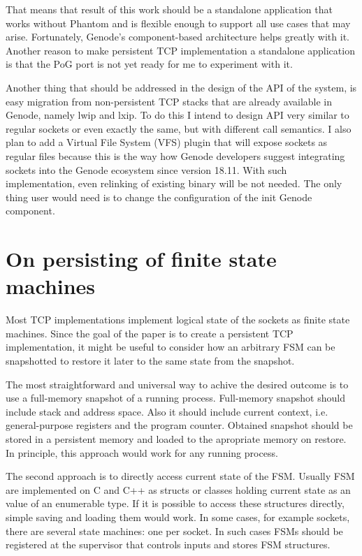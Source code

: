 That means that result of this work should be a standalone application that
works without Phantom and is flexible enough to support all use cases that may
arise. Fortunately, Genode's component-based architecture helps greatly with
it. Another reason to make persistent TCP implementation a standalone
application is that the PoG port is not yet ready for me to experiment with it.

Another thing that should be addressed in the design of the API of the system,
is easy migration from non-persistent TCP stacks that are already available in
Genode, namely lwip and lxip. To do this I intend to design API very similar to
regular sockets or even exactly the same, but with different call semantics. I
also plan to add a Virtual File System (VFS) plugin that will expose sockets as
regular files because this is the way how Genode developers suggest
integrating sockets into the Genode ecosystem since version 18.11. With such
implementation, even relinking of existing binary will be not needed. The only
thing user would need is to change the configuration of the init Genode
component.

\section{On persisting of finite state machines}

Most TCP implementations implement logical state of the sockets as finite state
machines. Since the goal of the paper is to create a persistent TCP
implementation, it might be useful to consider how an arbitrary FSM can be
snapshotted to restore it later to the same state from the snapshot. 

The most straightforward and universal way to achive the desired outcome is to
use a full-memory snapshot of a running process. Full-memory snapshot should
include stack and address space. Also it should include current context, i.e.
general-purpose registers and the program counter. Obtained snapshot should be
stored in a persistent memory and loaded to the apropriate memory on restore.
In principle, this approach would work for any running process.

The second approach is to directly access current state of the FSM. Usually FSM
are implemented on C and C++ as structs or classes holding current state as an
value of an enumerable type. If it is possible to access these structures
directly, simple saving and loading them would work. In some cases, for example
sockets, there are several state machines: one per socket. In such cases FSMs
should be registered at the supervisor that controls inputs and stores FSM
structures.

